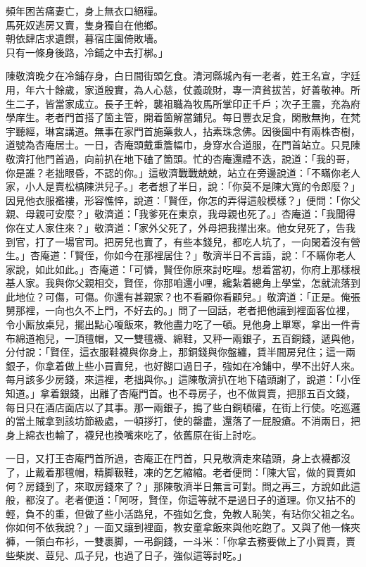 \begin{myquote}
頻年困苦痛妻亡，身上無衣口絕糧。\\馬死奴逃房又賣，隻身獨自在他鄉。\\朝依肆店求遺饌，暮宿庄園倚敗墻。\\只有一條身後路，冷鋪之中去打梆。」
\end{myquote}

陳敬濟晚夕在冷鋪存身，白日間街頭乞食。清河縣城內有一老者，姓王名宣，字廷用，年六十餘歲，家道殷實，為人心慈，仗義疏財，專一濟貧拔苦，好善敬神。所生二子，皆當家成立。長子王幹，襲祖職為牧馬所掌印正千戶；次子王震，充為府學庠生。老者門首搭了箇主管，開着箇解當鋪兒。每日豐衣足食，閑散無拘，在梵宇聽經，琳宮講道。無事在家門首施藥救人，拈素珠念佛。因後園中有兩株杏樹，道號為杏庵居士。一日，杏庵頭戴重簷幅巾，身穿水合道服，在門首站立。只見陳敬濟打他門首過，向前扒在地下磕了箇頭。忙的杏庵還禮不迭，說道：「我的哥，你是誰？老拙眼昏，不認的你。」這敬濟戰戰兢兢，站立在旁邊說道：「不瞞你老人家，小人是賣松槁陳洪兒子。」老者想了半日，說：「你莫不是陳大寬的令郎麼？」{}因見他衣服襤褸，形容憔悴，說道：「賢侄，你怎的弄得這般模樣？」便問：「你父親、母親可安麼？」敬濟道：「我爹死在東京，我母親也死了。」杏庵道：「我聞得你在丈人家住來？」敬濟道：「家外父死了，外母把我攆出來。他女兒死了，告我到官，打了一場官司。把房兒也賣了，有些本錢兒，都吃人坑了，一向閑着沒有營生。」杏庵道：「賢侄，你如今在那裡居住？」敬濟半日不言語，說：「不瞞你老人家說，如此如此。」{}杏庵道：「可憐，賢侄你原來討吃哩。想着當初，你府上那樣根基人家。我與你父親相交，賢侄，你那咱還小哩，纔紮着總角上學堂，怎就流落到此地位？可傷，可傷。你還有甚親家？也不看顧你看顧兒。」敬濟道：「正是。俺張舅那裡，一向也久不上門，不好去的。」問了一回話，老者把他讓到裡面客位裡，令小厮放桌兒，擺出點心嗄飯來，教他盡力吃了一頓。見他身上單寒，拿出一件青布綿道袍兒，一頂氊帽，又一雙氊襪、綿鞋，又秤一兩銀子，五百銅錢，遞與他，分付說：「賢侄，這衣服鞋襪與你身上，那銅錢與你盤纏，賃半間房兒住；這一兩銀子，你拿着做上些小買賣兒，也好餬口過日子，強如在冷鋪中，學不出好人來。{}每月該多少房錢，來這裡，老拙與你。」這陳敬濟扒在地下磕頭謝了，說道：「小侄知道。」拿着銀錢，出離了杏庵門首。也不尋房子，也不做買賣，把那五百文錢，每日只在酒店面店以了其事。{}那一兩銀子，搗了些白銅頓礶，在街上行使。{}吃巡邏的當土賊拿到該坊節級處，一頓拶打，使的罄盡，還落了一屁股瘡。不消兩日，把身上綿衣也輸了，襪兒也換嘴來吃了，依舊原在街上討吃。

一日，又打王杏庵門首所過，杏庵正在門首，只見敬濟走來磕頭，身上衣襪都沒了，止戴着那氊帽，精脚靸鞋，凍的乞乞縮縮。老者便問：「陳大官，做的買賣如何？房錢到了，來取房錢來了？」那陳敬濟半日無言可對。問之再三，方說如此這般，都沒了。老者便道：「阿呀，賢侄，你這等就不是過日子的道理。你又拈不的輕，負不的重，但做了些小活路兒，不強如乞食，免教人恥笑，有玷你父祖之名。你如何不依我說？」一面又讓到裡面，教安童拿飯來與他吃飽了。又與了他一條夾褲，一領白布衫，一雙裹脚，一弔銅錢，一斗米：「你拿去務要做上了小買賣，賣些柴炭、荳兒、瓜子兒，也過了日子，強似這等討吃。」

